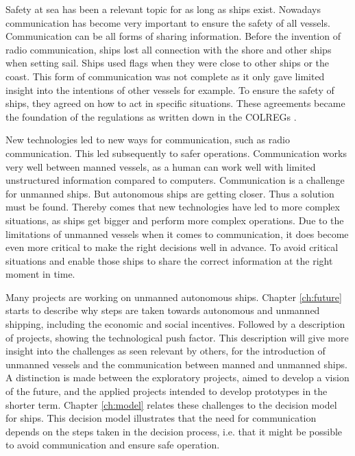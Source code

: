 
Safety at sea has been a relevant topic for as long as ships exist. Nowadays communication has become very important to ensure the safety of all vessels. Communication can be all forms of sharing information. Before the invention of radio communication, ships lost all connection with the shore and other ships when setting sail. Ships used flags when they were close to other ships or the coast. This form of communication was not complete as it only gave limited insight into the intentions of other vessels for example. To ensure the safety of ships, they agreed on how to act in specific situations. These agreements became the foundation of the regulations as written down in the \acf{COLREGs} \cite{IMO1972}.

New technologies led to new ways for communication, such as radio communication. This led subsequently to safer operations. Communication works very well between manned vessels, as a human can work well with limited unstructured information compared to computers. Communication is a challenge for unmanned ships. But autonomous ships are getting closer. Thus a solution must be found. Thereby comes that new technologies have led to more complex situations, as ships get bigger and perform more complex operations. Due to the limitations of unmanned vessels when it comes to communication, it does become even more critical to make the right decisions well in advance. To avoid critical situations and enable those ships to share the correct information at the right moment in time.

Many projects are working on unmanned autonomous ships. Chapter \ref{ch:future} starts to describe why steps are taken towards autonomous and unmanned shipping, including the economic and social incentives. Followed by a description of projects, showing the technological push factor. This description will give more insight into the challenges as seen relevant by others, for the introduction of unmanned vessels and the communication between manned and unmanned ships. A distinction is made between the exploratory projects, aimed to develop a vision of the future, and the applied projects intended to develop prototypes in the shorter term.
Chapter \ref{ch:model} relates these challenges to the decision model for ships. This decision model illustrates that the need for communication depends on the steps taken in the decision process, i.e. that it might be possible to avoid communication and ensure safe operation.